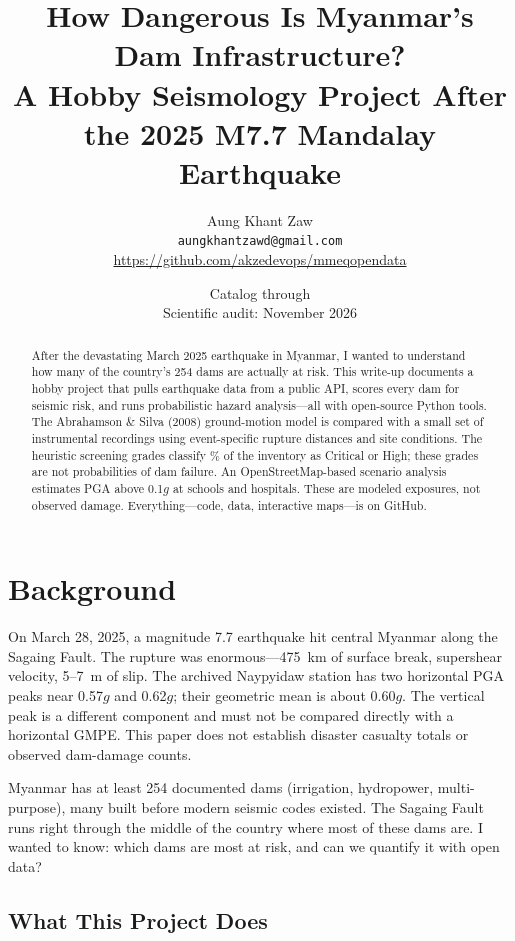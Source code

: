 \documentclass[11pt,a4paper]{article}
\title{\Large How Dangerous Is Myanmar's Dam Infrastructure?\\[0.3em]
\large A Hobby Seismology Project After the 2025 M7.7 Mandalay Earthquake}
\author{Aung Khant Zaw\\[0.3em]
\small \texttt{aungkhantzawd@gmail.com}\\
\small \url{https://github.com/akzedevops/mmeqopendata}}
\date{Catalog through \CatalogLatest\\Scientific audit: November 2026}
\begin{document}
\maketitle

\begin{abstract}
\noindent
After the devastating March 2025 earthquake in Myanmar, I wanted to understand how many of the country's 254 dams are actually at risk.
This write-up documents a hobby project that pulls earthquake data from a public API, scores every dam for seismic risk, and runs probabilistic hazard analysis---all with open-source Python tools.
The Abrahamson \& Silva (2008) ground-motion model is compared with a small set of instrumental recordings using event-specific rupture distances and site conditions. The heuristic screening grades classify \HighPercent\% of the inventory as Critical or High; these grades are not probabilities of dam failure.
An OpenStreetMap-based scenario analysis estimates PGA above 0.1$g$ at \SchoolCount{} schools and \HospitalCount{} hospitals. These are modeled exposures, not observed damage.
Everything---code, data, interactive maps---is on GitHub.
\end{abstract}

\tableofcontents
\newpage

\section{Background}

On March 28, 2025, a magnitude 7.7 earthquake hit central Myanmar along the Sagaing Fault.
The rupture was enormous---475~km of surface break, supershear velocity, 5--7~m of slip.
The archived Naypyidaw station has two horizontal PGA peaks near 0.57$g$ and 0.62$g$; their geometric mean is about 0.60$g$. The vertical peak is a different component and must not be compared directly with a horizontal GMPE. This paper does not establish disaster casualty totals or observed dam-damage counts.

Myanmar has at least 254 documented dams (irrigation, hydropower, multi-purpose), many built before modern seismic codes existed.
The Sagaing Fault runs right through the middle of the country where most of these dams are.
I wanted to know: which dams are most at risk, and can we quantify it with open data?

\subsection{What This Project Does}
\end{document}
